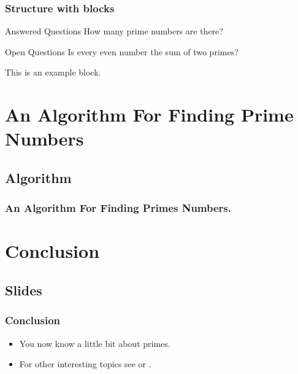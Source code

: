 \documentclass[
	9pt,							%
	mathserif, 				%
	aspectratio=169		%
]{beamer}
\begin{document}
\begin{frame}
	\frametitle{Structure with blocks}

	\begin{block}{Answered Questions}
		How many prime numbers are there?
	\end{block}

	\begin{block}{Open Questions}
		Is every even number the sum of two primes?
	\end{block}

	\begin{exampleblock}{}
		This is an example block. 
	\end{exampleblock}

\end{frame}

\section[Algorithm]{An Algorithm For Finding Prime Numbers} 
\subsection*{Algorithm}


\begin{frame}[fragile]
  \frametitle{An Algorithm For Finding Primes Numbers.}
	\Lst
\end{frame}

\section[Conclusion]{Conclusion} 
\subsection*{Slides}

\begin{frame}
	\frametitle{Conclusion}

	\begin{itemize}
		\item 
			You now know a little bit about primes.

		\item
			For other interesting topics see 
			\cite{Shannon} or \cite{Einstein}.

	\end{itemize}

\end{frame}
\end{document}
